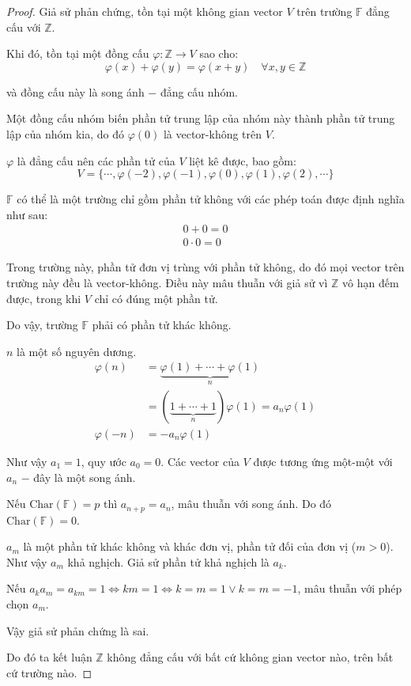 \documentclass[class=linear-algebra,crop=false]{standalone}
\begin{document}
\begin{proof}Giả sử phản chứng, tồn tại một không gian vector $V$ trên trường $\mathbb{F}$ đẳng cấu với $\mathbb{Z}$.
    \par Khi đó, tồn tại một đồng cấu $\varphi: \mathbb{Z}\rightarrow V$ sao cho:
    \[ \varphi(x) + \varphi(y) = \varphi(x + y)\quad\forall x, y\in\mathbb{Z} \]
    \par và đồng cấu này là song ánh $-$ đẳng cấu nhóm.
    \par Một đồng cấu nhóm biến phần tử trung lập của nhóm này thành phần tử trung lập của nhóm kia, do đó $\varphi(0)$ là vector-không trên $V$.
    \par $\varphi$ là đẳng cấu nên các phần tử của $V$ liệt kê được, bao gồm:
    \[ V = \{ \cdots, \varphi(-2), \varphi(-1), \varphi(0), \varphi(1), \varphi(2), \cdots \} \]
    \par $\mathbb{F}$ có thể là một trường chỉ gồm phần tử không với các phép toán được định nghĩa như sau:
    \begin{align*}
        0 + 0 = 0 \\
        0\cdot 0 = 0
    \end{align*}
    \par Trong trường này, phần tử đơn vị trùng với phần tử không, do đó mọi vector trên trường này đều là vector-không. Điều này mâu thuẫn với giả sử vì $\mathbb{Z}$ vô hạn đếm được, trong khi $V$ chỉ có đúng một phần tử.
    \par Do vậy, trường $\mathbb{F}$ phải có phần tử khác không.
    \par $n$ là một số nguyên dương.
    \begin{align*}
        \varphi(n)  & =\underbrace{\varphi(1) + \cdots + \varphi(1)}_{n}            \\
                    & =(\underbrace{1 + \cdots + 1}_{n})\varphi(1) =a_{n}\varphi(1) \\
        \varphi(-n) & =-a_{n}\varphi(1)
    \end{align*}
    \par Như vậy $a_{1} = 1$, quy ước $a_{0} = 0$. Các vector của $V$ được tương ứng một-một với $a_{n}$ $-$ đây là một song ánh.
    \par Nếu $\text{Char}(\mathbb{F}) = p$ thì $a_{n + p} = a_{n}$, mâu thuẫn với song ánh. Do đó $\text{Char}(\mathbb{F}) = 0$.
    \par $a_{m}$ là một phần tử khác không và khác đơn vị, phần tử đối của đơn vị ($m > 0$). Như vậy $a_{m}$ khả nghịch. Giả sử phần tử khả nghịch là $a_{k}$.
    \par Nếu $a_{k}a_{m} = a_{km} = 1 \Leftrightarrow km = 1 \Leftrightarrow k = m = 1 \vee k = m = -1$, mâu thuẫn với phép chọn $a_{m}$.
    \par Vậy giả sử phản chứng là sai.
    \par Do đó ta kết luận $\mathbb{Z}$ không đẳng cấu với bất cứ không gian vector nào, trên bất cứ trường nào.
\end{proof}
\end{document}
